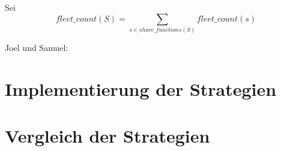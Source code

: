 \documentclass[a4paper,12pt]{llncs}
\numberwithin{equation}{section}
\begin{document}
\begin{definition}
Sei
\[
fleet\_count(S)=\sum_{s \in share\_functions(S)}{fleet\_count(s)}
\]
\end{definition}

Joel und Samuel:

\section{Implementierung der Strategien}

\section{Vergleich der Strategien}


\newpage

 

\end{document}
